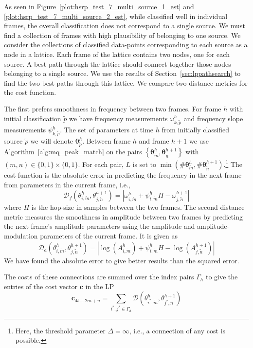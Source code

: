 As seen in Figure~\ref{plot:hsrp_test_7_multi_source_1_est} and
\ref{plot:hsrp_test_7_multi_source_2_est}, while
classified well in individual frames, the overall classification does not
correspond to a single source. We must find a collection of frames with high
plausibility of belonging to one source. We consider the collections of
classified data-points corresponding to each source as a node in a lattice. Each
frame of the lattice contains two nodes, one for each source. A best path
through the lattice should connect together those nodes belonging to a single
source. We use the results of
Section~\ref{sec:lppathsearch} to find the two best paths through this lattice.
We compare two distance metrics for the cost function.

The first prefers
smoothness in frequency between two frames. For frame $h$ with initial
classification $\tilde{p}$ we have frequency measurements
$\omega_{k,\tilde{p}}^{h}$
and frequency slope measurements $\psi_{k,\tilde{p}}^{h}$. The set of parameters
at time $h$ from initially classified source $\tilde{p}$ we will denote
$\boldsymbol{\theta}_{\tilde{p}}^{h}$. Between frame $h$ and frame $h+1$ we use
Algorithm~\ref{alg:mq_peak_match} on the pairs $\left\{ \boldsymbol{\theta}_{\tilde{m}}^{h},
\boldsymbol{\theta}_{\tilde{n}}^{h+1} \right\}$ with $(m,n) \in \{0,1\} \times
\{0,1\}$. For
each pair, $L$ is set to $\min(\# \boldsymbol{\theta}_{\tilde{m}}^{h} ,
\# \boldsymbol{\theta}_{\tilde{n}}^{h+1}).$\footnote{Here, the threshold parameter $\Delta
= \infty$, i.e., a connection of any cost is possible.} The cost function is the absolute error
in predicting the frequency in the next frame from parameters in the current
frame, i.e.,
\[
    \mathcal{D}_{f} \left( \theta_{i,\tilde{m}}^{h},
    \theta_{j,\tilde{n}}^{h+1} \right) = | \omega_{i,\tilde{m}}^{h} +
    \psi_{i,\tilde{m}}^{h} H - \omega_{j,\tilde{n}}^{h+1} |
\]
where $H$ is the hop-size in samples between the two frames.  The second
distance metric measures the smoothness in amplitude between two frames by
predicting the next frame's amplitude parameters using the amplitude and
amplitude-modulation parameters of the current frame.  It is given as
\[
    \mathcal{D}_{a} \left( \theta_{i,\tilde{m}}^{h},
    \theta_{j,\tilde{n}}^{h+1} \right) = | \log(A_{i,\tilde{m}}^{h}) +
    \psi_{i,\tilde{m}}^{h} H - \log(A_{j,\tilde{n}}^{h+1}) |
\]
We have found the absolute error to
give better results than the squared error.

The costs of these connections
are summed over the index pairs $\Gamma_{h}$ to give the entries of the cost
vector $\boldsymbol{c}$ in the LP
\[
    \boldsymbol{c}_{4t + 2m + n} = \sum_{i^{\ast},j^{\ast} \in \Gamma_{h}}
    \mathcal{D} \left( \theta_{i^{\ast},\tilde{m}}^{h}, \theta_{j^{\ast},\tilde{n}}^{h+1}
    \right)
\]

